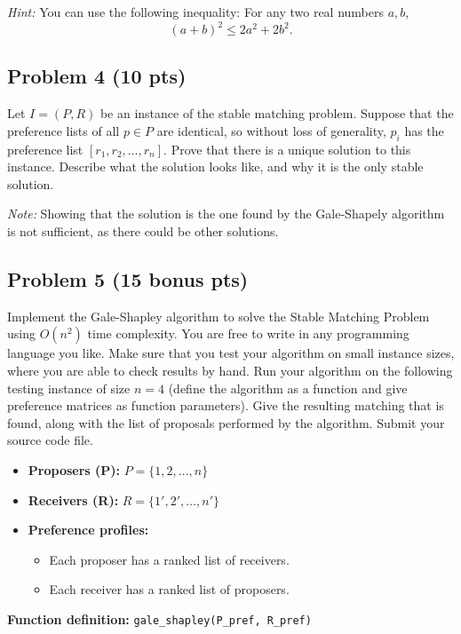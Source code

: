 \documentclass[12pt]{article}
\begin{document}
\textit{Hint:} You can use the following inequality: For any two real numbers $a, b$, 
\[
(a+b)^2 \leq 2a^2 + 2b^2.
\]

\subsection*{Problem 4 (10 pts)}

Let $I = (P, R)$ be an instance of the stable matching problem. Suppose that the preference lists of all $p \in P$ are identical, so without loss of generality, $p_i$ has the preference list $[r_1, r_2, \ldots, r_n]$. Prove that there is a unique solution to this instance. Describe what the solution looks like, and why it is the only stable solution.

\textit{Note:} Showing that the solution is the one found by the Gale-Shapely algorithm is not sufficient, as there could be other solutions.

\subsection*{Problem 5 (15 bonus pts)}

Implement the Gale-Shapley algorithm to solve the Stable Matching Problem using $O(n^2)$ time complexity. You are free to write in any programming language you like. Make sure that you test your algorithm on small instance sizes, where you are able to check results by hand. Run your algorithm on the following testing instance of size $n=4$ (define the algorithm as a function and give preference matrices as function parameters). Give the resulting matching that is found, along with the list of proposals performed by the algorithm. Submit your source code file.

\begin{itemize}
    \item \textbf{Proposers (P):} $P= \{1, 2, \ldots, n\}$
    \item \textbf{Receivers (R):} $R= \{1', 2', \ldots, n'\}$
    \item \textbf{Preference profiles:}
    \begin{itemize}
        \item Each proposer has a ranked list of receivers.
        \item Each receiver has a ranked list of proposers.
    \end{itemize}
\end{itemize}


\textbf{Function definition:} \texttt{gale\_shapley(P\_pref, R\_pref)} \\
\end{document}
